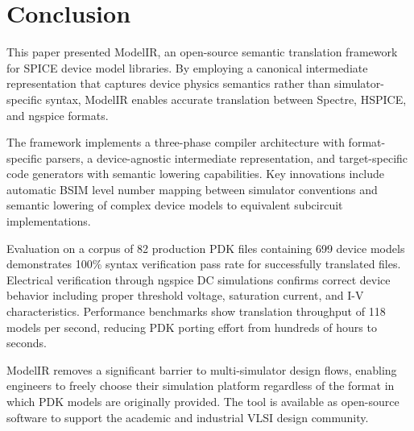 \documentclass[conference]{IEEEtran}
\begin{document}
\section{Conclusion}

This paper presented ModelIR, an open-source semantic translation framework for SPICE device model libraries. By employing a canonical intermediate representation that captures device physics semantics rather than simulator-specific syntax, ModelIR enables accurate translation between Spectre, HSPICE, and ngspice formats.

The framework implements a three-phase compiler architecture with format-specific parsers, a device-agnostic intermediate representation, and target-specific code generators with semantic lowering capabilities. Key innovations include automatic BSIM level number mapping between simulator conventions and semantic lowering of complex device models to equivalent subcircuit implementations.

Evaluation on a corpus of 82 production PDK files containing 699 device models demonstrates 100\% syntax verification pass rate for successfully translated files. Electrical verification through ngspice DC simulations confirms correct device behavior including proper threshold voltage, saturation current, and I-V characteristics. Performance benchmarks show translation throughput of 118 models per second, reducing PDK porting effort from hundreds of hours to seconds.

ModelIR removes a significant barrier to multi-simulator design flows, enabling engineers to freely choose their simulation platform regardless of the format in which PDK models are originally provided. The tool is available as open-source software to support the academic and industrial VLSI design community.
\end{document}
